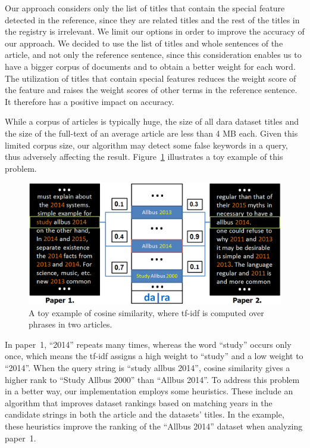 \documentclass{IOS-Book-Article}
\newcommand{\dara}{\textsf{da\textbar ra}}
\begin{document}
Our approach considers only the list of titles that contain the special feature detected in the reference, since they are related titles and the rest of the titles in the registry is irrelevant.
We limit our options in order to improve the accuracy of our approach.
We decided to use the list of titles and whole sentences of the article, and not only the reference sentence, since this consideration enables us to have a bigger corpus of documents and to obtain a better weight for each word.
The utilization of titles that contain special features reduces the weight score of the feature and raises the weight scores of other terms in the reference sentence.
It therefore has a positive impact on accuracy.

While a corpus of articles is typically huge, the size of all {\dara} dataset titles and the size of the full-text of an average article are less than 4 MB each.
Given this limited corpus size, our algorithm may detect some false keywords in a query, thus adversely affecting the result.
Figure~\ref{fig:similarity-example} illustrates a toy example of this problem.

\begin{figure}[h]
	\centering
	\includegraphics[width=4.5 in]{ToyExamplE.PNG} 
	\caption{A toy example of cosine similarity, where tf-idf is computed over phrases in two articles.}
	\label{fig:similarity-example}
\end{figure}

In paper~1, \enquote{2014} repeats many times, whereas the word \enquote{study} occurs only once, which means the tf-idf assigns a high weight to \enquote{study} and a low weight to \enquote{2014}. When the query string is \enquote{study allbus 2014}, cosine similarity gives a higher rank to \enquote{Study Allbus 2000} than \enquote{Allbus 2014}.
To address this problem in a better way, our implementation employs some heuristics.
These include an algorithm that improves dataset rankings based on matching years in the candidate strings in both the article and the datasets' titles.
In the example, these heuristics improve the ranking of the \enquote{Allbus 2014} dataset when analyzing paper~1. 
\end{document}
